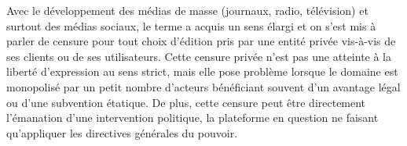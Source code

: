 Avec le développement des médias de masse (journaux, radio, télévision) et surtout des médias sociaux, le terme a acquis un sens élargi et on s'est mis à parler de censure pour tout choix d'édition pris par une entité privée vis-à-vis de ses clients ou de ses utilisateurs. Cette censure privée n'est pas une atteinte à la liberté d'expression au sens strict, mais elle pose problème lorsque le domaine est monopolisé par un petit nombre d'acteurs bénéficiant souvent d'un avantage légal ou d'une subvention étatique. De plus, cette censure peut être directement l'émanation d'une intervention politique, la plateforme en question ne faisant qu'appliquer les directives générales du pouvoir. %

